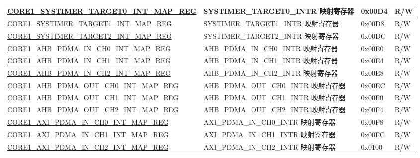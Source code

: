 \begin{longtable}{ | p{8.7cm} | p{6.2cm} | p{1.3cm} | p{1cm} | }
\hyperref[regdesc:CORE1SYSTIMERTARGET0INTMAPREG]{CORE1\_SYSTIMER\_TARGET0\_INT\_MAP\_REG} & SYSTIMER\_TARGET0\_INTR 映射寄存器 & 0x00D4 & R/W \\ \hline

\hyperref[regdesc:CORE1SYSTIMERTARGET1INTMAPREG]{CORE1\_SYSTIMER\_TARGET1\_INT\_MAP\_REG} & SYSTIMER\_TARGET1\_INTR 映射寄存器 & 0x00D8 & R/W \\ \hline

\hyperref[regdesc:CORE1SYSTIMERTARGET2INTMAPREG]{CORE1\_SYSTIMER\_TARGET2\_INT\_MAP\_REG} & SYSTIMER\_TARGET2\_INTR 映射寄存器 & 0x00DC & R/W \\ \hline

\hyperref[regdesc:CORE1AHBPDMAINCH0INTMAPREG]{CORE1\_AHB\_PDMA\_IN\_CH0\_INT\_MAP\_REG} & AHB\_PDMA\_IN\_CH0\_INTR 映射寄存器 & 0x00E0 & R/W \\ \hline

\hyperref[regdesc:CORE1AHBPDMAINCH1INTMAPREG]{CORE1\_AHB\_PDMA\_IN\_CH1\_INT\_MAP\_REG} & AHB\_PDMA\_IN\_CH1\_INTR 映射寄存器 & 0x00E4 & R/W \\ \hline

\hyperref[regdesc:CORE1AHBPDMAINCH2INTMAPREG]{CORE1\_AHB\_PDMA\_IN\_CH2\_INT\_MAP\_REG} & AHB\_PDMA\_IN\_CH2\_INTR 映射寄存器 & 0x00E8 & R/W \\ \hline

\hyperref[regdesc:CORE1AHBPDMAOUTCH0INTMAPREG]{CORE1\_AHB\_PDMA\_OUT\_CH0\_INT\_MAP\_REG} & AHB\_PDMA\_OUT\_CH0\_INTR 映射寄存器 & 0x00EC & R/W \\ \hline

\hyperref[regdesc:CORE1AHBPDMAOUTCH1INTMAPREG]{CORE1\_AHB\_PDMA\_OUT\_CH1\_INT\_MAP\_REG} & AHB\_PDMA\_OUT\_CH1\_INTR 映射寄存器 & 0x00F0 & R/W \\ \hline

\hyperref[regdesc:CORE1AHBPDMAOUTCH2INTMAPREG]{CORE1\_AHB\_PDMA\_OUT\_CH2\_INT\_MAP\_REG} & AHB\_PDMA\_OUT\_CH2\_INTR 映射寄存器 & 0x00F4 & R/W \\ \hline

\hyperref[regdesc:CORE1AXIPDMAINCH0INTMAPREG]{CORE1\_AXI\_PDMA\_IN\_CH0\_INT\_MAP\_REG} & AXI\_PDMA\_IN\_CH0\_INTR 映射寄存器 & 0x00F8 & R/W \\ \hline

\hyperref[regdesc:CORE1AXIPDMAINCH1INTMAPREG]{CORE1\_AXI\_PDMA\_IN\_CH1\_INT\_MAP\_REG} & AXI\_PDMA\_IN\_CH1\_INTR 映射寄存器 & 0x00FC & R/W \\ \hline

\hyperref[regdesc:CORE1AXIPDMAINCH2INTMAPREG]{CORE1\_AXI\_PDMA\_IN\_CH2\_INT\_MAP\_REG} & AXI\_PDMA\_IN\_CH2\_INTR 映射寄存器 & 0x0100 & R/W \\ \hline


\end{longtable}
